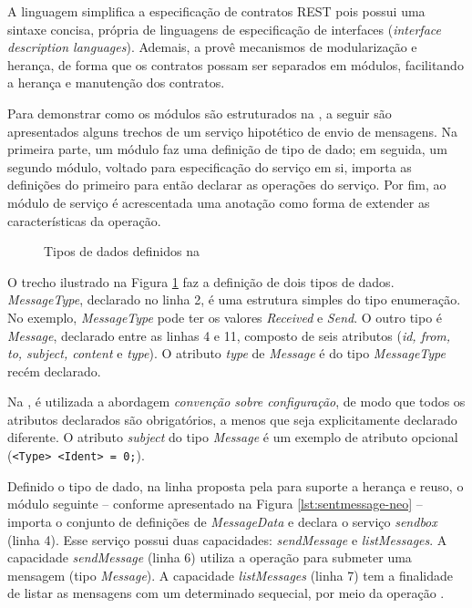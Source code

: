 A linguagem \neoidl{} simplifica a especificação de contratos REST pois possui
uma sintaxe concisa, própria de linguagens de especificação de interfaces
(\emph{interface description languages}). Ademais, a \neoidl{} provê mecanismos de
modularização e herança, de forma que os contratos possam ser separados em
módulos, facilitando a herança e manutenção dos
contratos. 

Para demonstrar como os módulos são estruturados na
\neoidl{}, a seguir são apresentados alguns trechos de um serviço hipotético
de envio de mensagens. Na primeira parte, um módulo faz uma definição de tipo
de dado; em seguida, um segundo módulo, voltado para especificação do serviço em
si, importa as definições do primeiro para então declarar as operações do
serviço. Por fim, ao módulo de serviço é acrescentada uma anotação como
forma de extender as características da operação.

\vspace{6mm}

\begin{figure}[h]
\begin{small}

\vspace{-.5cm}
\end{small} 
\caption{Tipos de dados definidos na \neoidl}
\label{lst:messagedata-neo}
\end{figure}

O trecho ilustrado na Figura \ref{lst:messagedata-neo} faz a definição de dois
tipos de dados. \emph{MessageType}, declarado no linha 2, é uma estrutura
simples do tipo enumeração. No exemplo, \emph{MessageType} pode ter os valores
\emph{Received} e \emph{Send}.
O outro tipo é \emph{Message}, declarado entre as linhas 4 e 11,
composto de seis atributos (\emph{id, from, to, subject, content} e
\emph{type}).
O atributo \emph{type} de \emph{Message} é do tipo \emph{MessageType} recém declarado.

Na \neoidl{}, é utilizada a abordagem \emph{convenção sobre configuração}, de
modo que todos os atributos declarados são obrigatórios, a menos que
seja explicitamente declarado diferente. O atributo \emph{subject} do tipo
\emph{Message} é um exemplo de atributo opcional (\texttt{<Type> <Ident> = 0;}).

Definido o tipo de dado, na linha proposta pela \neoidl{} para
suporte a herança e reuso, o módulo seguinte -- conforme apresentado na Figura
\ref{lst:sentmessage-neo} -- importa o conjunto de definições de
\emph{MessageData} e declara o serviço \emph{sendbox} (linha 4). Esse serviço possui duas capacidades:
\emph{sendMessage} e \emph{listMessages}.
A capacidade \emph{sendMessage} (linha 6) utiliza a operação  para
submeter uma mensagem (tipo \emph{Message}). A capacidade \emph{listMessages}
(linha 7) tem a finalidade de listar as mensagens com um determinado sequecial,
por meio da operação .

